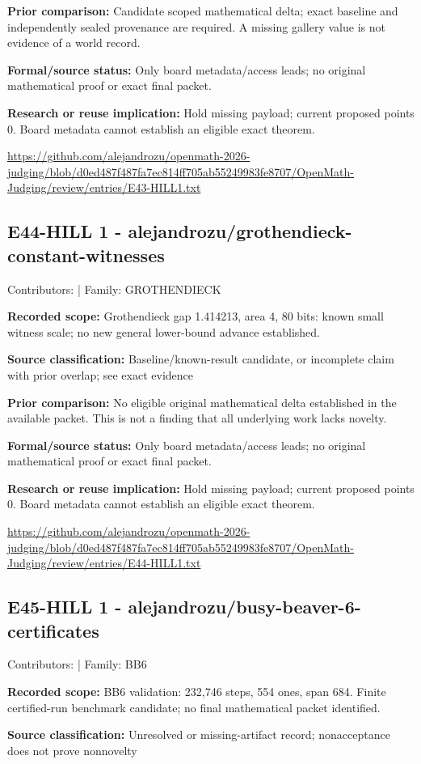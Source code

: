 \documentclass[11pt,a4paper]{article}
\begin{document}
\textbf{Prior comparison:} Candidate scoped mathematical delta; exact baseline and independently sealed provenance are required. A missing gallery value is not evidence of a world record.

\textbf{Formal/source status:} Only board metadata/access leads; no original mathematical proof or exact final packet. 

\textbf{Research or reuse implication:} Hold missing payload; current proposed points 0. Board metadata cannot establish an eligible exact theorem.

{\small \url{https://github.com/alejandrozu/openmath-2026-judging/blob/d0ed487f487fa7ec814ff705ab55249983fe8707/OpenMath-Judging/review/entries/E43-HILL1.txt}\par}

\begin{samepage}
\subsection{E44-HILL 1  -  alejandrozu/grothendieck-constant-witnesses}
{\small Contributors:  | Family: GROTHENDIECK\par}

\textbf{Recorded scope:} Grothendieck gap 1.414213, area 4, 80 bits: known small witness scale; no new general lower-bound advance established.

\end{samepage}
\textbf{Source classification:} Baseline/known-result candidate, or incomplete claim with prior overlap; see exact evidence

\textbf{Prior comparison:} No eligible original mathematical delta established in the available packet. This is not a finding that all underlying work lacks novelty.

\textbf{Formal/source status:} Only board metadata/access leads; no original mathematical proof or exact final packet. 

\textbf{Research or reuse implication:} Hold missing payload; current proposed points 0. Board metadata cannot establish an eligible exact theorem.

{\small \url{https://github.com/alejandrozu/openmath-2026-judging/blob/d0ed487f487fa7ec814ff705ab55249983fe8707/OpenMath-Judging/review/entries/E44-HILL1.txt}\par}

\begin{samepage}
\subsection{E45-HILL 1  -  alejandrozu/busy-beaver-6-certificates}
{\small Contributors:  | Family: BB6\par}

\textbf{Recorded scope:} BB6 validation: 232,746 steps, 554 ones, span 684. Finite certified-run benchmark candidate; no final mathematical packet identified.

\end{samepage}
\textbf{Source classification:} Unresolved or missing-artifact record; nonacceptance does not prove nonnovelty
\end{document}
